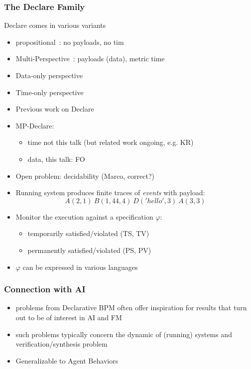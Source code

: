 \documentclass{beamer}
\begin{document}
\begin{frame}
\frametitle{The Declare Family}

Declare comes in various variants

\begin{itemize}
	\item propositional~\cite{}: no payloads, no tim
	\item Multi-Perspective~\cite{}: payloads (data), metric time
	\item Data-only perspective
	\item Time-only perspective
\end{itemize}


\begin{itemize}
	\item Previous work on Declare
	\item MP-Declare:
		\begin{itemize}
			\item time not this talk (but related work ongoing, e.g. KR)
			\item data, this talk: FO
		\end{itemize}
	\item Open problem: decidability (Marco, correct?)
\end{itemize}



\begin{itemize}
	\item Running system produces finite traces of \emph{events} with payload: 
	$$A(2,1)~B(1,44,4)~D('hello',3)~A(3,3)$$ 
	
	\item Monitor the execution against a specification $\varphi$:
		\begin{itemize}
			\item temporarily satisfied/violated (TS, TV)
			\item permanently satisfied/violated (PS, PV)
		\end{itemize}	
	
	\item $\varphi$ can be expressed in various languages
\end{itemize}

\end{frame}


\begin{frame}
\frametitle{Connection with AI}

\begin{itemize}
	\item problems from Declarative BPM often offer inspiration for 
		results that turn out to be of interest in AI and FM
	\item such problems typically concern the dynamic of (running) systems and 
		verification/synthesis problem
	\item Generalizable to Agent Behaviors
\end{itemize}

\end{frame}
\end{document}

